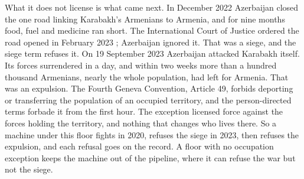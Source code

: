 What it does not license is what came next. In December 2022 Azerbaijan closed the one road linking Karabakh's Armenians to Armenia, and for nine months food, fuel and medicine ran short. The International Court of Justice ordered the road opened in February 2023 \autocite{icj2023lachin}; Azerbaijan ignored it. That was a siege, and the siege term refuses it. On 19 September 2023 Azerbaijan attacked Karabakh itself. Its forces surrendered in a day, and within two weeks more than a hundred thousand Armenians, nearly the whole population, had left for Armenia. That was an expulsion. The Fourth Geneva Convention, Article 49, forbids deporting or transferring the population of an occupied territory, and the person-directed terms forbade it from the first hour. The exception licensed force against the forces holding the territory, and nothing that changes who lives there. So a machine under this floor fights in 2020, refuses the siege in 2023, then refuses the expulsion, and each refusal goes on the record. A floor with no occupation exception keeps the machine out of the pipeline, where it can refuse the war but not the siege.
